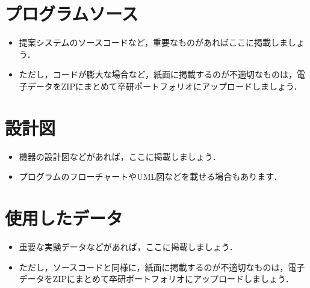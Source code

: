 \documentclass[uplatex,draft]{ipsjpapers}
\begin{document}
\section{プログラムソース}
 \begin{itemize}
   \item 提案システムのソースコードなど，重要なものがあればここに掲載しましょう．
   \item ただし，コードが膨大な場合など，紙面に掲載するのが不適切なものは，電子データをZIPにまとめて卒研ポートフォリオにアップロードしましょう．
 \end{itemize}
\section{設計図}
 \begin{itemize}
   \item 機器の設計図などがあれば，ここに掲載しましょう．
   \item プログラムのフローチャートやUML図などを載せる場合もあります．
 \end{itemize}
\section{使用したデータ}
 \begin{itemize}
   \item 重要な実験データなどがあれば，ここに掲載しましょう．
   \item ただし，ソースコードと同様に，紙面に掲載するのが不適切なものは，電子データをZIPにまとめて卒研ポートフォリオにアップロードしましょう．
 \end{itemize}
\end{document}
